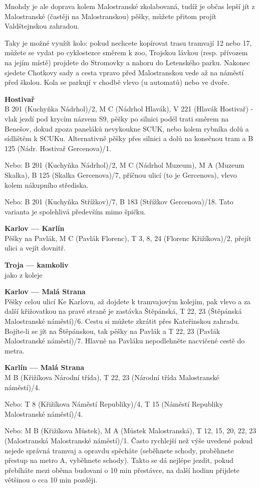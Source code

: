 Mnohdy je ale doprava kolem Malostranské zkolabovaná, tudíž je občas lepší jít z
Malostranské (častěji na Malostranskou) pěšky, můžete přitom projít
Valdštejnskou zahradou.

Taky je možné využít kolo: pokud nechcete kopírovat trasu tramvají 12 nebo 17,
můžete se vydat po cyklostezce směrem k zoo, Trojskou lávkou (resp. přívozem na
jejím místě) projdete do Stromovky a nahoru do Letenského parku. Nakonec sjedete
Chotkovy sady a cesta vpravo před Malostranskou vede až na náměstí před školou.
Kola se parkují v chodbě vlevo (u automatů) nebo ve dvoře.

\textbf{Hostivař}\\
B 201 (Kuchyňka \ra Nádrhol)/2, M C (Nádrhol \ra Hlavák), V 221 (Hlavák \ra
Hostivař) - vlak jezdí pod krycím názvem S9, pěšky po silnici podél trati směrem
na Benešov, dokud zpoza paneláků nevykoukne SCUK, nebo kolem rybníka dolů a
sídlištěm k SCUKu. Alternativně pěšky přes silnici a dolů na konečnou tram a B
125 (Nádr. Hostivař \ra Gercenova)/1.

Nebo: B 201 (Kuchyňka \ra Nádrhol)/2, M C (Nádrhol \ra Muzeum), M A (Muzeum \ra
Skalka), B 125 (Skalka \ra Gercenova)/7, příčnou ulicí (to je Gercenova), vlevo
kolem nákupního střediska.

Nebo: B 201 (Kuchyňka \ra Střížkov)/7, B 183 (Střížkov \ra Gercenova)/18. Tato
varianta je spolehlivá především mimo špičku.

\textbf{Karlov --- Karlín}\\
Pěšky na Pavlák, M C (Pavlák \ra Florenc), T 3, 8, 24 (Florenc \ra Křižíkova)/2,
přejít ulici a vejít dovnitř.

\textbf{Troja --- kamkoliv}\\
jako z koleje

\textbf{Karlov --- Malá Strana}\\
Pěšky celou ulicí Ke Karlovu, až dojdete k tramvajovým kolejím, pak vlevo a za
další křižovatkou na pravé straně je zastávka Štěpánská, T 22, 23 (Štěpánská \ra
Malostranské náměstí)/6. Cestu si můžete zkrátit přes Kateřinskou zahradu.
Bojíte-li se jít na Štěpánskou, tak pěšky na Pavlák a T 22, 23 (Pavlák \ra
Malostranské náměstí)/7. Hlavně na Pavláku nepodlehněte nacvičené cestě do
metra.

\textbf{Karlín --- Malá Strana}\\
M B (Křižíkova \ra Národní třída), T 22, 23 (Národní třída \ra Malostranské
náměstí)/4.

Nebo: T 8 (Křižíkova \ra Náměstí Republiky)/4, T 15 (Náměstí Republiky \ra
Malostranské náměstí)/4.

Nebo: M B (Křižíkova \ra Můstek), M A (Můstek \ra Malostranská), T 12, 15, 20,
22, 23 (Malostranská \ra Malostranské náměstí)/1. Často rychlejší než výše
uvedené pokud nejede správná tramvaj a opravdu spěcháte (seběhnete schody,
proběhnete přestup na metro A, vyběhnete schody). Takto se dá nejlépe jezdit,
pokud přebíháte mezi oběma budovani o 10 min přestávce, na další hodinu přijdete
většinou o cca 10 min později.